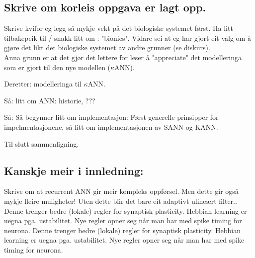 \subsection{Skrive om korleis oppgava er lagt opp.}
Skrive kvifor eg legg så mykje vekt på det biologiske systemet først. Ha litt tilbakepeik til / snakk litt om : "bionics". Vidare sei at eg har gjort eit valg om å gjøre det likt det biologiske systemet av andre grunner (se diskurs).\\
Anna grunn er at det gjør det lettere for leser å "appreciate" det modelleringa som er gjort til den nye modellen ($\kappa$ANN).

Deretter: modelleringa til $\kappa$ANN.

Så: litt om ANN: historie, ???

Så: Så begynner litt om implementasjon: Først generelle prinsipper for impelmentasjonene, så litt om implementasjonen av SANN og KANN.

Til slutt sammenligning.


\subsection{Kanskje meir i innledning:}

Skrive om at recurrent ANN gir meir kompleks oppførsel. Men dette gir også mykje fleire muligheter! Uten dette blir det bare eit adaptivt ulineært filter..
Denne trenger bedre (lokale) regler for synaptisk plasticity. Hebbian learning er uegna pga. ustabilitet. Nye regler opner seg når man har med spike timing for neurona. 
Denne trenger bedre (lokale) regler for synaptisk plasticity. Hebbian learning er uegna pga. ustabilitet. Nye regler opner seg når man har med spike timing for neurona. 

